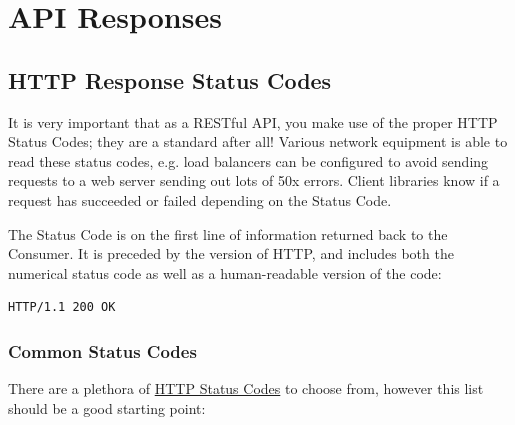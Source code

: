 \documentclass{book}
\begin{document}
\chapter{API Responses}

\section{HTTP Response Status Codes}

It is very important that as a RESTful API, you make use of the proper HTTP Status Codes; they are a standard after all! Various network equipment is able to read these status codes, e.g. load balancers can be configured to avoid sending requests to a web server sending out lots of 50x errors. Client libraries know if a request has succeeded or failed depending on the Status Code.

The Status Code is on the first line of information returned back to the Consumer. It is preceded by the version of HTTP, and includes both the numerical status code as well as a human-readable version of the code:

\begin{verbatim}
HTTP/1.1 200 OK
\end{verbatim}

\subsection{Common Status Codes}

There are a plethora of \href{http://www.w3.org/Protocols/rfc2616/rfc2616-sec10.html}{HTTP Status Codes} to choose from, however this list should be a good starting point:
\end{document}
